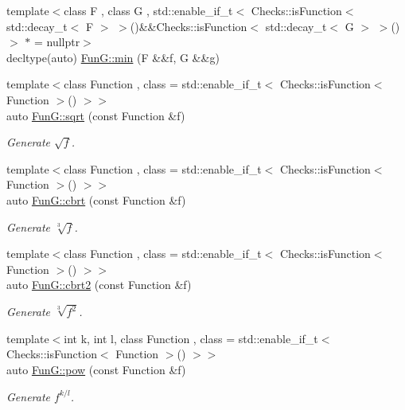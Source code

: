 \begin{DoxyCompactItemize}
\item 
{\footnotesize template$<$class F , class G , std\+::enable\+\_\+if\+\_\+t$<$ Checks\+::is\+Function$<$ std\+::decay\+\_\+t$<$ F $>$ $>$()\&\&\+Checks\+::is\+Function$<$ std\+::decay\+\_\+t$<$ G $>$ $>$() $>$ $\ast$  = nullptr$>$ }\\decltype(auto) \hyperlink{group__CMathGroup_ga3f7e080cc9d1ca2b99cb4d2f41ed557c}{Fun\+G\+::min} (F \&\&f, G \&\&g)
\item 
{\footnotesize template$<$class Function , class  = std\+::enable\+\_\+if\+\_\+t$<$ Checks\+::is\+Function$<$ Function $>$() $>$$>$ }\\auto \hyperlink{group__CMathGroup_ga136c890475e48f88469a737d95368d05}{Fun\+G\+::sqrt} (const Function \&f)
\begin{DoxyCompactList}\small\item\em Generate $ \sqrt{f} $. \end{DoxyCompactList}\item 
{\footnotesize template$<$class Function , class  = std\+::enable\+\_\+if\+\_\+t$<$ Checks\+::is\+Function$<$ Function $>$() $>$$>$ }\\auto \hyperlink{group__CMathGroup_gaa7f2552adfb8ec41aeb685adddd8bf98}{Fun\+G\+::cbrt} (const Function \&f)
\begin{DoxyCompactList}\small\item\em Generate $ \sqrt[3]{f} $. \end{DoxyCompactList}\item 
{\footnotesize template$<$class Function , class  = std\+::enable\+\_\+if\+\_\+t$<$ Checks\+::is\+Function$<$ Function $>$() $>$$>$ }\\auto \hyperlink{group__CMathGroup_gafd27322fb64c6df3366f384c93819a06}{Fun\+G\+::cbrt2} (const Function \&f)
\begin{DoxyCompactList}\small\item\em Generate $ \sqrt[3]{f^2}$. \end{DoxyCompactList}\item 
{\footnotesize template$<$int k, int l, class Function , class  = std\+::enable\+\_\+if\+\_\+t$<$ Checks\+::is\+Function$<$ Function $>$() $>$$>$ }\\auto \hyperlink{group__CMathGroup_gaecae6fa60bbfc0eb1867581ee4577d4e}{Fun\+G\+::pow} (const Function \&f)
\begin{DoxyCompactList}\small\item\em Generate $ f^{k/l} $. \end{DoxyCompactList}\item 

\end{DoxyCompactItemize}

